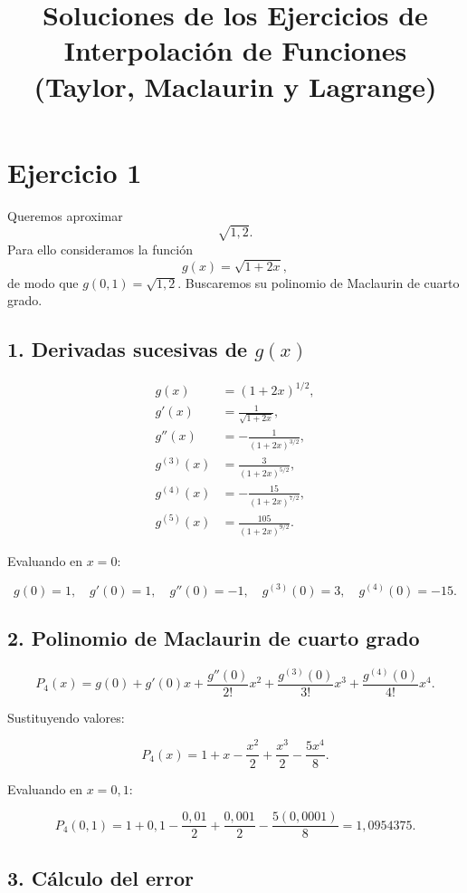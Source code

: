 \documentclass[12pt]{article}
\title{Soluciones de los Ejercicios de Interpolación de Funciones \\[4pt] \large (Taylor, Maclaurin y Lagrange)}
\author{}
\date{}
\begin{document}
\maketitle

\bigskip

\section*{Ejercicio 1}

Queremos aproximar
\[
\sqrt{1{,}2}.
\]
Para ello consideramos la función
\[
g(x) = \sqrt{1 + 2x},
\]
de modo que \( g(0{,}1) = \sqrt{1{,}2} \).
Buscaremos su polinomio de Maclaurin de cuarto grado.

\subsection*{1. Derivadas sucesivas de \( g(x) \)}

\[
\begin{aligned}
g(x) &= (1+2x)^{1/2}, \\[4pt]
g'(x) &= \frac{1}{\sqrt{1+2x}}, \\[4pt]
g''(x) &= -\frac{1}{(1+2x)^{3/2}}, \\[4pt]
g^{(3)}(x) &= \frac{3}{(1+2x)^{5/2}}, \\[4pt]
g^{(4)}(x) &= -\frac{15}{(1+2x)^{7/2}}, \\[4pt]
g^{(5)}(x) &= \frac{105}{(1+2x)^{9/2}}.
\end{aligned}
\]

Evaluando en \(x = 0\):

\[
g(0)=1, \quad g'(0)=1, \quad g''(0)=-1, \quad g^{(3)}(0)=3, \quad g^{(4)}(0)=-15.
\]

\subsection*{2. Polinomio de Maclaurin de cuarto grado}

\[
P_4(x) = g(0) + g'(0)x + \frac{g''(0)}{2!}x^2 + \frac{g^{(3)}(0)}{3!}x^3 + \frac{g^{(4)}(0)}{4!}x^4.
\]

Sustituyendo valores:

\[
P_4(x) = 1 + x - \frac{x^2}{2} + \frac{x^3}{2} - \frac{5x^4}{8}.
\]

Evaluando en \(x = 0{,}1\):

\[
P_4(0{,}1) = 1 + 0{,}1 - \frac{0{,}01}{2} + \frac{0{,}001}{2} - \frac{5(0{,}0001)}{8} = \boxed{1{,}0954375.}
\]

\subsection*{3. Cálculo del error}
\end{document}
